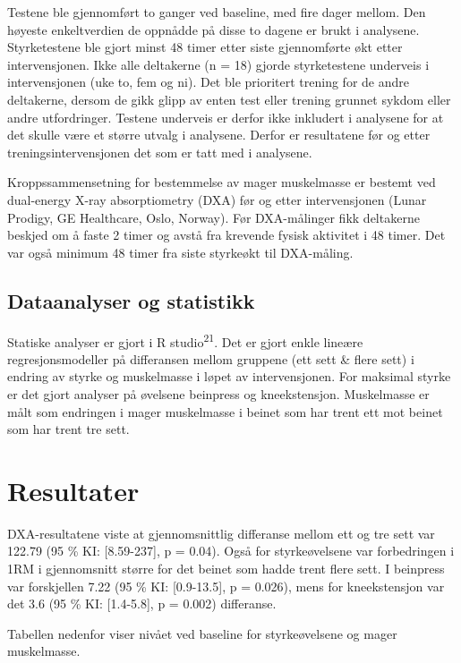 \documentclass[
  letterpaper,
  DIV=11,
  numbers=noendperiod]{scrreprt}
\begin{document}
Testene ble gjennomført to ganger ved baseline, med fire dager mellom.
Den høyeste enkeltverdien de oppnådde på disse to dagene er brukt i
analysene. Styrketestene ble gjort minst 48 timer etter siste
gjennomførte økt etter intervensjonen. Ikke alle deltakerne (n = 18)
gjorde styrketestene underveis i intervensjonen (uke to, fem og ni). Det
ble prioritert trening for de andre deltakerne, dersom de gikk glipp av
enten test eller trening grunnet sykdom eller andre utfordringer.
Testene underveis er derfor ikke inkludert i analysene for at det skulle
være et større utvalg i analysene. Derfor er resultatene før og etter
treningsintervensjonen det som er tatt med i analysene.

Kroppssammensetning for bestemmelse av mager muskelmasse er bestemt ved
dual-energy X-ray absorptiometry (DXA) før og etter intervensjonen
(Lunar Prodigy, GE Healthcare, Oslo, Norway). Før DXA-målinger fikk
deltakerne beskjed om å faste 2 timer og avstå fra krevende fysisk
aktivitet i 48 timer. Det var også minimum 48 timer fra siste styrkeøkt
til DXA-måling.

\subsection{Dataanalyser og
statistikk}\label{dataanalyser-og-statistikk}

Statiske analyser er gjort i R studio\textsuperscript{21}. Det er gjort
enkle lineære regresjonsmodeller på differansen mellom gruppene (ett
sett \& flere sett) i endring av styrke og muskelmasse i løpet av
intervensjonen. For maksimal styrke er det gjort analyser på øvelsene
beinpress og kneekstensjon. Muskelmasse er målt som endringen i mager
muskelmasse i beinet som har trent ett mot beinet som har trent tre
sett.

\section{Resultater}\label{resultater}

DXA-resultatene viste at gjennomsnittlig differanse mellom ett og tre
sett var 122.79 (95 \% KI: {[}8.59-237{]}, p = 0.04). Også for
styrkeøvelsene var forbedringen i 1RM i gjennomsnitt større for det
beinet som hadde trent flere sett. I beinpress var forskjellen 7.22 (95
\% KI: {[}0.9-13.5{]}, p = 0.026), mens for kneekstensjon var det 3.6
(95 \% KI: {[}1.4-5.8{]}, p = 0.002) differanse.

Tabellen nedenfor viser nivået ved baseline for styrkeøvelsene og mager
muskelmasse.
\end{document}

